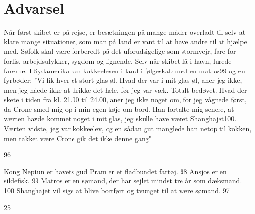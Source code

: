 \chapter{Advarsel}

Når først skibet er på rejse, er besætningen på mange måder overladt til
selv at klare mange situationer, som man på land er vant til at have
andre til at hjælpe med. Søfolk skal være forberedt på det
uforudsigelige som stormvejr, fare for forlis, arbejdsulykker, sygdom og
lignende. Selv når skibet lå i havn, lurede farerne. I Sydamerika var
kokkeeleven i land i følgeskab med en matros99 og en fyrbøder: ''Vi fik
hver et stort glas øl. Hvad der var i mit glas øl, aner jeg ikke, men
jeg nåede ikke at drikke det hele, før jeg var væk. Totalt bedøvet. Hvad
der skete i tiden fra kl. 21.00 til 24.00, aner jeg ikke noget om, for
jeg vågnede først, da Crone smed mig op i min egen køje om bord. Han
fortalte mig senere, at værten havde kommet noget i mit glas, jeg skulle
have været Shanghajet100. Værten vidste, jeg var kokkeelev, og en sådan
gut manglede han netop til kokken, men takket være Crone gik det ikke
denne gang"

96

Kong Neptun er havets gud Pram er et fladbundet fartøj. 98 Ansjos er en
sildefisk. 99 Matros er en sømand, der har sejlet mindst tre år som
dæksmand. 100 Shanghajet vil sige at blive bortført og tvunget til at
være sømand. 97

25

